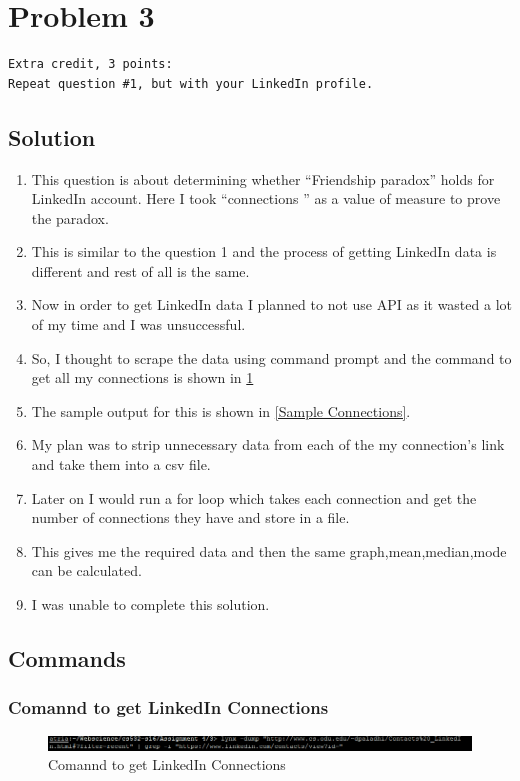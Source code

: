\section{Problem 3}
\label{part3}
\begin{verbatim}
Extra credit, 3 points:
Repeat question #1, but with your LinkedIn profile.
\end{verbatim}
\subsection{Solution}
\begin{enumerate}

\item This question is about determining whether ``Friendship paradox'' holds for LinkedIn account. Here I took ``connections '' as a value of measure to prove the paradox.
\item This is similar to the question 1 and the process of getting LinkedIn data is different and rest of all is the same.
\item Now in order to get LinkedIn data I planned to not use API as it wasted a lot of my time and I was unsuccessful.
\item So, I thought to scrape the data using command prompt and the command to get all my connections is shown in \ref{code1}
\item The sample output for this is shown in \ref{Sample Connections}.
\item My plan was to strip unnecessary data from each of the my connection's link and take them into a csv file.
\item Later on I would run a for loop which takes each connection and get the number of connections they have and store in a file.
\item This gives me the required data and then the same graph,mean,median,mode can be calculated. 
\item I was unable to complete this solution. 

\newpage
\end{enumerate}
\subsection{Commands}
\subsubsection{Comannd to get LinkedIn Connections}
\begin{figure}[ht]    
    \begin{center}
        \includegraphics[scale=0.8]{Code_toget_connections.png}
        \caption{Comannd to get LinkedIn Connections}
        \label{code1}
    \end{center}
\end{figure}
